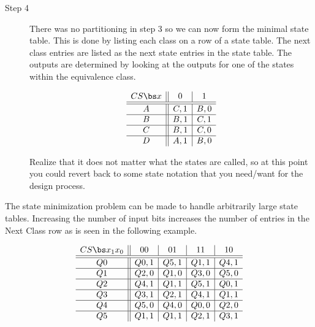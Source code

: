 \begin{description}
\item[Step 4]
There was no partitioning in step 3 so we can now form the minimal
state table.  This is done by listing each class on a row of a 
state table.  The next class entries are listed as the next state
entries in the state table.  The outputs are determined by looking
at the outputs for one of the states within the equivalence class.

$$ \begin{array} {c||c|c}
    CS \bs x & 0     & 1    \\ \hline \hline
    A       & C,1  & B,0 \\ \hline
    B       & B,1  & C,1 \\ \hline
    C       & B,1  & C,0 \\ \hline
    D       & A,1  & B,0 \\ 
\end{array} $$ 

Realize that it does not matter what the states are
called, so at this point you could revert back to some state notation
that you need/want for the design process.
\end{description}

The state minimization problem can be made to handle arbitrarily
large state tables.  Increasing the number of input bits increases the
number of entries in the  Next Class row as is seen in the following example.

$$ \begin{array} {c||c|c|c|c}
  CS \bs x_1 x_0 & 00    & 01   & 11    & 10   \\ \hline \hline
        Q0       & Q0,1  & Q5,1 & Q1,1  & Q4,1 \\ \hline
        Q1       & Q2,0  & Q1,0 & Q3,0  & Q5,0 \\ \hline
        Q2       & Q4,1  & Q1,1 & Q5,1  & Q0,1 \\ \hline
        Q3       & Q3,1  & Q2,1 & Q4,1  & Q1,1 \\ \hline
        Q4       & Q5,0  & Q4,0 & Q0,0  & Q2,0 \\ \hline
        Q5       & Q1,1  & Q1,1 & Q2,1  & Q3,1 \\
\end{array} $$

